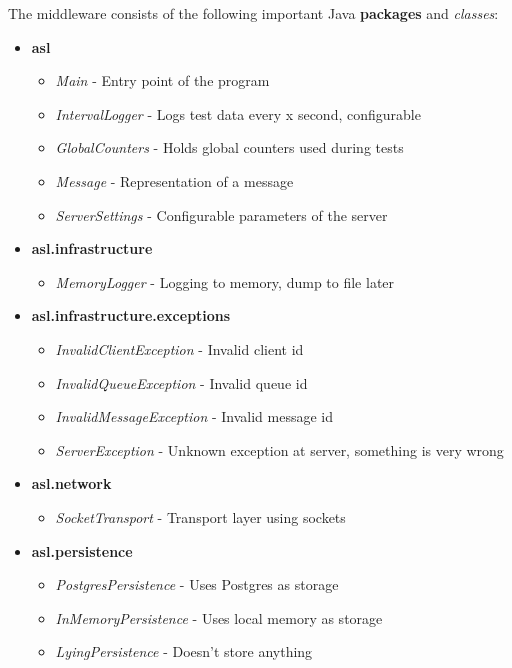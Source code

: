 \documentclass{article}
\begin{document}
            The middleware consists of the following important Java \textbf{packages} and \textit{classes}:
            \begin{itemize}
                \item \textbf{asl}
                \begin{itemize}
                    \item \textit{Main} - Entry point of the program
                    \item \textit{IntervalLogger} - Logs test data every x second, configurable
                    \item \textit{GlobalCounters} - Holds global counters used during tests
                    \item \textit{Message} - Representation of a message
                    \item \textit{ServerSettings} - Configurable parameters of the server
                \end{itemize}
                \item \textbf{asl.infrastructure}
                \begin{itemize}
                    \item \textit{MemoryLogger} - Logging to memory, dump to file later
                \end{itemize}
                \item \textbf{asl.infrastructure.exceptions}
                \begin{itemize}
                    \item \textit{InvalidClientException} - Invalid client id
                    \item \textit{InvalidQueueException} - Invalid queue id
                    \item \textit{InvalidMessageException} - Invalid message id
                    \item \textit{ServerException} - Unknown exception at server, something is very wrong
                \end{itemize}
                \item \textbf{asl.network}
                \begin{itemize}
                    \item \textit{SocketTransport} - Transport layer using sockets
                \end{itemize}
                \item \textbf{asl.persistence}
                \begin{itemize}
                    \item \textit{PostgresPersistence} - Uses Postgres as storage
                    \item \textit{InMemoryPersistence} - Uses local memory as storage
                    \item \textit{LyingPersistence} - Doesn't store anything
                \end{itemize}
            \end{itemize}
\end{document}
